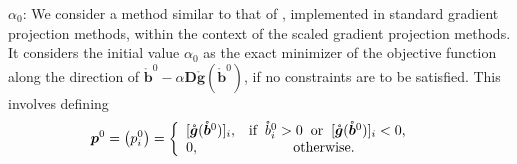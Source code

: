 \documentclass[11pt]{article}
\newcommand{\0}{\phantom{0}}
\begin{document}
\begin{compactitem}
	\item $\alpha_0$: We consider a method similar to that of \citet{Figueiredo2007}, implemented in standard gradient projection methods, within the context of the scaled gradient projection methods. It considers the initial value $\alpha_{0}$ as the exact minimizer of the objective function along the direction of $\mathring{\bm{b}}^{0} - \alpha \bm{D} \mathring{\bm{g}}(\mathring{\bm{b}}^{0})$, if no constraints are to be satisfied. This involves defining
	      \begin{align*}
		      \bm{p}^{0} = \left(p^{0}_{i}\right) & =
		      \left\{\begin{array}{ll}
			      [\mathring{\bm{g}}(\mathring{\bm{b}}^{0})]_{i}, & \mbox{$\text{if} \hspace{2mm} \mathring{b}_{i}^{0} > 0 \hspace{2mm} \text{or} \hspace{2mm} [\mathring{\bm{g}}(\mathring{\bm{b}}^{0})]_{i} < 0,$} \\
			      0,                                      & \mbox{\hspace{1cm} \text{otherwise}}.
		      \end{array}\right.
	      \end{align*}


\end{compactitem}
\end{document}
